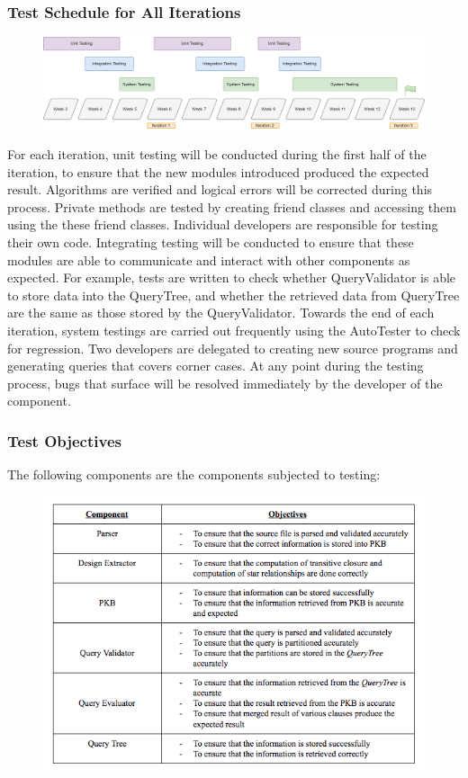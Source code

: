 \documentclass[12pt]{article}
\begin{document}
{{{{{{{{{{\subsubsection{Test Schedule for All Iterations}
\begin{figure}[!htbp]
  \centering 
 \includegraphics[width=1.0\textwidth]{test_schedule.png}
\end{figure}
For each iteration, unit testing will be conducted during the first half of the iteration, to ensure that the new modules introduced produced the expected result. Algorithms are verified and logical errors will be corrected during this process. Private methods are tested by creating friend classes and accessing them using the these friend classes. Individual developers are responsible for testing their own code. Integrating testing will be conducted to ensure that these modules are able to communicate and interact with other components as expected. For example, tests are written to check whether QueryValidator is able to store data into the QueryTree, and whether the retrieved data from QueryTree are the same as those stored by the QueryValidator. Towards the end of each iteration, system testings are carried out frequently using the AutoTester to check for regression. Two developers are delegated to creating new source programs and generating queries that covers corner cases. At any point during the testing process, bugs that surface will be resolved immediately by the developer of the component.
\subsubsection{Test Objectives}
The following components are the components subjected to testing: 
\begin{figure}[!htbp]
  \centering 
 \includegraphics[width=1.1\textwidth]{component_tests.png}
\end{figure}
}}}}}}}}}}
\end{document}
